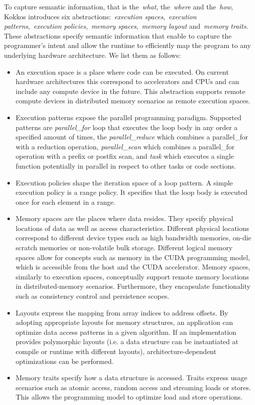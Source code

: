 To capture semantic information, that is the~\emph{what}, the~\emph{where} and the~\emph{how}, Kokkos introduces six abstractions:~\emph{execution spaces},~\emph{execution patterns},~\emph{execution policies},~\emph{memory spaces},~\emph{memory layout} and~\emph{memory traits}. These abstractions specify semantic information that enable to capture the programmer's intent and allow the runtime to efficiently map the program to any underlying hardware architecture. We list them as follows:
\begin{itemize}
	\item  An execution space is a place where code can be executed. On current hardware architectures this correspond to accelerators and CPUs and can include any compute device in the future. This abstraction supports remote compute devices in distributed memory scenarios as remote execution spaces.
	\item Execution patterns expose the parallel programming paradigm. Supported patterns are \emph{parallel\_for} loop that executes the loop body in any order a specified amount of times, the \emph{parallel\_reduce} which combines a parallel\_for with a reduction operation, \emph{parallel\_scan} which combines a parallel\_for operation with a prefix or postfix scan, and \emph{task} which executes a single function potentially in parallel in respect to other tasks or code sections. 
	\item Execution policies shape the iteration space of a loop pattern. A simple execution policy is a range policy. It specifies that the loop body is executed once for each element in a range.
	\item Memory spaces are the places where data resides. They specify physical locations of data as well as access characteristics. Different physical locations correspond to different device types such as high bandwidth memories, on-die scratch memories or non-volatile bulk storage. Different logical memory spaces allow for concepts such as memory in the CUDA programming model, which is accessible from the host and the CUDA accelerator. Memory spaces, similarly to execution spaces, conceptually support remote memory locations in distributed-memory scenarios. Furthermore, they encapsulate functionality such as consistency control and persistence scopes.
	\item Layouts express the mapping from array indices to address offsets. By adopting appropriate layouts for memory structures, an application can optimize data access patterns in a given algorithm. If an implementation provides polymorphic layouts (i.e. a data structure can be instantiated at compile or runtime with different layouts), architecture-dependent optimizations can be performed.
	\item Memory traits specify how a data structure is accessed. Traits express usage scenarios such as atomic access, random access and streaming loads or stores. This allows the programming model to  optimize load and store operations.
\end{itemize}

